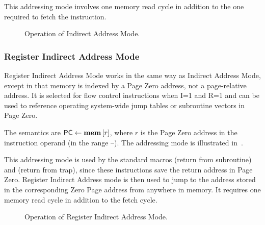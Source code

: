 This addressing mode involves one memory read cycle in addition to the one
required to fetch the instruction.

\begin{figure}[htb]
 \centering
     
\caption[Indirect Address Mode]{\label{fig:indirect-address-mode} Operation
  of Indirect Address Mode.}
\end{figure}


\subsubsection{Register Indirect Address Mode}
\label{sec:register-indirect-address-mode}

Register Indirect Address Mode works in the same way as Indirect Address Mode,
except in that memory is indexed by a Page Zero address, not a page-relative
address. It is selected for flow control instructions when I=1 and R=1 and can
be used to reference operating system-wide jump tables or subroutine vectors in
Page Zero.

The semantics are $\mbox{\PC}\eq\mem{r}$, where $r$ is the \gls{Page Zero}
address in the instruction operand (in the range –). The
addressing mode is illustrated in~.

This addressing mode is used by the standard macros  (return from
subroutine) and  (return from trap), since these instructions save the
return address in \gls{Page Zero}. Register Indirect Address mode is then used
to jump to the address stored in the corresponding Zero Page address from
anywhere in memory. It requires one memory read cycle in addition to the fetch
cycle.

\begin{figure}[htb]
 \centering
     
\caption[Register Indirect Address Mode]{\label{fig:register-indirect-address-mode} Operation
  of Register Indirect Address Mode.}
\end{figure}





